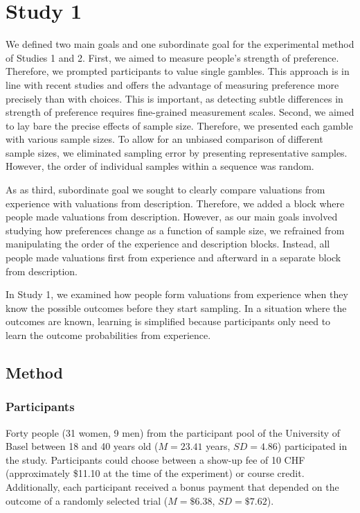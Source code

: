 \documentclass[a4paper,man, natbib]{apa6} %
\begin{document}
\section{Study 1}
We defined two main goals and one subordinate goal for the experimental method of Studies 1 and 2. First, we aimed to measure people's strength of preference. Therefore, we prompted participants to value single gambles. This approach is in line with recent studies \citep[e.g.,][]{Ashby2014, Golan2014, Pachur2012} and offers the advantage of measuring preference more precisely than with choices. This is important, as detecting subtle differences in strength of preference requires fine-grained measurement scales. Second, we aimed to lay bare the precise effects of sample size. Therefore, we presented each gamble with various sample sizes. To allow for an unbiased comparison of different sample sizes, we eliminated sampling error by presenting representative samples. However, the order of individual samples within a sequence was random.

As as third, subordinate goal we sought to clearly compare valuations from experience with valuations from description. Therefore, we added a block where people made valuations from description. However, as our main goals involved studying how preferences change as a function of sample size, we refrained from manipulating the order of the experience and description blocks. Instead, all people made valuations first from experience and afterward in a separate block from description. 

In Study 1, we examined how people form valuations from experience when they know the possible outcomes before they start sampling. In a situation where the outcomes are known, learning is simplified because participants only need to learn the outcome probabilities from experience. 

\subsection{Method}
\subsubsection{Participants}
Forty people (31 women, 9 men) from the participant pool of the University of Basel between 18 and 40 years old ($M = 23.41$ years, $SD = 4.86$) participated in the study. Participants could choose between a show-up fee of 10 CHF (approximately \$11.10 at the time of the experiment) or course credit. Additionally, each participant received a bonus payment that depended on the outcome of a randomly selected trial ($M = \$6.38$, $SD = \$7.62$).
\end{document}
